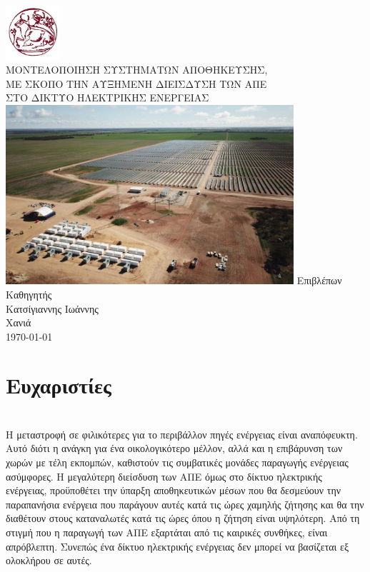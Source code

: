 \documentclass[12pt]{report}
\begin{document}
\begin{titlepage}
	\centering
	\includegraphics[width=0.15\textwidth]{logo} \\ 
	\vspace{2cm}
	{\scshape\Large ΜΟΝΤΕΛΟΠΟΙΗΣΗ ΣΥΣΤΗΜΑΤΩΝ ΑΠΟΘΗΚΕΥΣΗΣ, \\ΜΕ ΣΚΟΠΟ ΤΗΝ ΑΥΞΗΜΕΝΗ ΔΙΕΙΣΔΥΣΗ ΤΩΝ ΑΠΕ \\ΣΤΟ ΔΙΚΤΥΟ ΗΛΕΚΤΡΙΚΗΣ ΕΝΕΡΓΕΙΑΣ \\}
	\vspace{2cm}
	\includegraphics[width=0.8\textwidth]{gannawarra2}
	\vfill
	Eπιβλέπων Καθηγητής\\
	Κατσίγιαννης Ιωάννης \\
	\vspace{1cm}
	{\large Χανιά \\ \today \\}
\end{titlepage}

\tableofcontents
\chapter*{Ευχαριστίες}
\chapter*{{}}
Η μεταστροφή σε φιλικότερες για το περιβάλλον πηγές ενέργειας είναι αναπόφευκτη. Αυτό διότι η ανάγκη για ένα οικολογικότερο μέλλον, αλλά και η επιβάρυνση των χωρών με τέλη εκπομπών, καθιστούν τις συμβατικές μονάδες παραγωγής ενέργειας
ασύμφορες. Η μεγαλύτερη διείσδυση των ΑΠΕ όμως στο δίκτυο ηλεκτρικής ενέργειας, προϋποθέτει την ύπαρξη αποθηκευτικών μέσων που θα δεσμεύουν την παραπανήσια ενέργεια που παράγουν αυτές κατά τις ώρες χαμηλής ζήτησης και θα την 
διαθέτουν στους καταναλωτές κατά τις ώρες όπου η ζήτηση είναι υψηλότερη. Από τη στιγμή που η παραγωγή των ΑΠΕ εξαρτάται από τις καιρικές συνθήκες, είναι απρόβλεπτη. Συνεπώς ένα δίκτυο ηλεκτρικής ενέργειας δεν μπορεί να βασίζεται 
εξ ολοκλήρου σε αυτές.
\end{document}
